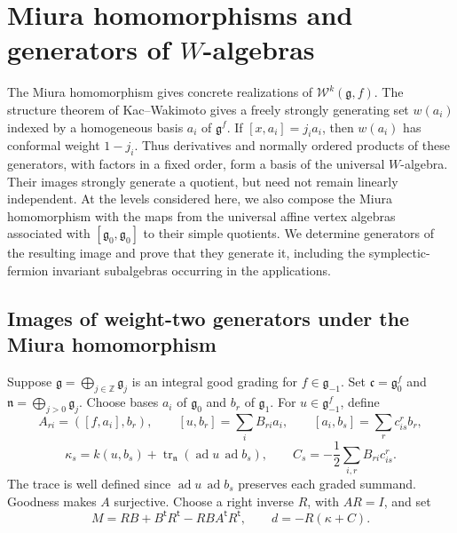 \documentclass[11pt,a4paper]{amsart}
\numberwithin{equation}{section}
\theoremstyle{definition}
\theoremstyle{remark}
\newcommand{\Z}{\mathbb Z}
\newcommand{\g}{\mathfrak g}
\newcommand{\tr}{\operatorname{tr}}
\newcommand{\ad}{\operatorname{ad}}
\begin{document}
\section{\texorpdfstring{Miura homomorphisms and generators of $W$-algebras}{Miura homomorphisms and generators of W-algebras}}
\label{vtwo:image-tools}
The Miura homomorphism gives concrete realizations of
$\mathcal W^k(\g,f)$. The structure theorem of Kac--Wakimoto
\cite[Theorem~4.1]{KacWakimoto2004} gives a freely strongly generating
set $w(a_i)$ indexed by a homogeneous basis $a_i$ of $\g^f$.
If $[x,a_i]=j_i a_i$, then $w(a_i)$ has conformal weight $1-j_i$.
Thus derivatives and normally ordered products of these generators,
with factors in a fixed order, form a basis of the universal
$W$-algebra. Their images strongly generate a quotient, but need not
remain linearly independent. At the levels considered here,
we also compose the Miura homomorphism with the maps from the
universal affine vertex algebras associated with $[\g_0,\g_0]$
to their simple quotients. We determine generators of the resulting image and prove that they
generate it, including the symplectic-fermion invariant
subalgebras occurring in the applications.

\subsection{Images of weight-two generators under the Miura homomorphism}\label{com:quadratic-miura-section}
Suppose $\g=\bigoplus_{j\in\Z}\g_j$ is an integral good grading
for $f\in\g_{-1}$. Set $\mathfrak c=\g_0^f$ and
$\mathfrak n=\bigoplus_{j>0}\g_j$. Choose bases $a_i$ of $\g_0$
and $b_r$ of $\g_1$. For $u\in\g_{-1}^f$, define
$$
 A_{ri}=([f,a_i],b_r),\qquad [u,b_r]=\sum_i B_{ri}a_i,
 \qquad [a_i,b_s]=\sum_r c_{is}^{r}b_r,
$$
$$
 \kappa_s=k(u,b_s)+\tr_{\mathfrak n}(\ad u\,\ad b_s),
 \qquad C_s=-\frac12\sum_{i,r}B_{ri}c_{is}^{r}.
$$
The trace is well defined since $\ad u\,\ad b_s$ preserves each
graded summand. Goodness makes $A$ surjective. Choose a right inverse
$R$, with $AR=I$, and set
\begin{equation}\label{com:quadratic-miura-formula}
 M=RB+B^{\mathsf t}R^{\mathsf t}-RBA^{\mathsf t}R^{\mathsf t},
 \qquad d=-R(\kappa+C).
\end{equation}
\end{document}
